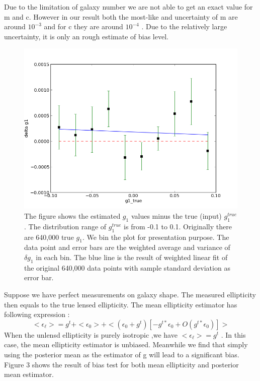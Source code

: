 \documentclass[useAMS,usenatbib]{mn2e}
\begin{document}
Due to the limitation of galaxy number we are not able to get an exact value for m and c. However in our result 
both the most-like and uncertainty of m are around $10^{-3}$ and for c they are around $10^{-4}$ . Due to the
relatively large uncertainty, it is only an rough estimate of bias level.
\begin{figure}
\includegraphics[scale=0.5]{fig/g1bias}

\caption{The figure shows the estimated $g_{1}$ values minus the true (input)
$g_{1}^{true}$. The distribution range of $g_{1}^{true}$ is from
-0.1 to 0.1. Originally there are 640,000 true $g_{1}$. We bin the
plot for presentation purpose. The data point and error bars are the weighted
 average and  variance of $\delta g_{1}$ in each bin. The blue
line is the result of weighted linear fit of the original 640,000 data points
with sample standard deviation as error bar.}
\end{figure}
Suppose we have perfect measurements on galaxy shape. The measured ellipticity then equals to the true lensed ellipticity. The mean ellipticity
estimator has following expression :
\begin{equation}
<\epsilon_{\ell}>=g^{t}+<\epsilon_{0}>+<(\epsilon_{0}+g^{t})[-g^{t*}\epsilon_{0}+O(g^{t*}\epsilon_{0})]>
\end{equation}
When the unlensd ellipticity is purely isotropic ,we have $<\epsilon_{\ell}>=g^{t}$ . In this case, the mean ellipticity estimator is 
unbiased.
Meanwhile we find that simply using the posterior mean as the estimator of g will lead to a significant bias. 
Figure 3 shows the result of bias test for both mean ellipticity and posterior mean estimator.
\end{document}

